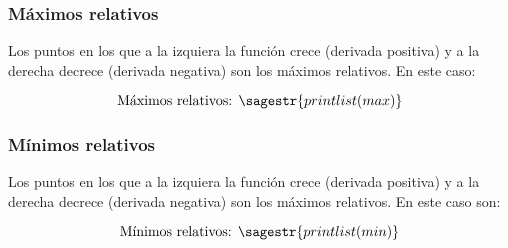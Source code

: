 
\subsubsection{Máximos relativos}
\ifverbose
Los puntos en los que a la izquiera la función crece (derivada positiva) y a la derecha decrece (derivada negativa) son los máximos relativos. En este caso: 
\fi

\[\text{Máximos relativos: } \sagestr{printlist(max)}\]

\subsubsection{Mínimos relativos}
\ifverbose
Los puntos en los que a la izquiera la función crece (derivada positiva) y a la derecha decrece (derivada negativa) son los máximos relativos. En este caso son: 
\fi

\[\text{Mínimos relativos: }\sagestr{printlist(min)}\]





